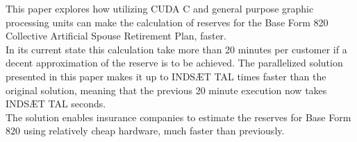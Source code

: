 


This paper explores how utilizing CUDA C and general purpose graphic processing units can make the calculation of reserves for the Base Form 820 Collective Artificial Spouse Retirement Plan, faster. \\

In its current state this calculation take more than 20 minutes per customer if a decent approximation of the reserve is to be achieved. The parallelized solution presented in this paper makes it up to INDSÆT TAL times faster than the original solution, meaning that the previous 20 minute execution now takes INDSÆT TAL seconds. \\

The solution enables insurance companies to estimate the reserves for Base Form 820 using relatively cheap hardware, much faster than previously.

